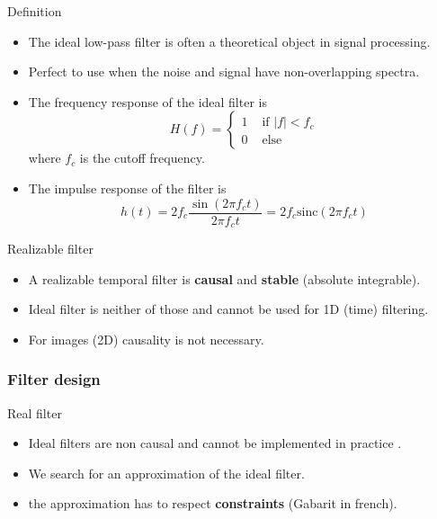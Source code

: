   \begin{block}{Definition}
    \begin{itemize}
    \item The ideal low-pass filter is often a theoretical object in signal processing.
    \item Perfect to use when the noise and signal have non-overlapping spectra.
    \item The frequency response of the ideal filter is 
$$
H(f)= \left \{ 
\begin{array}{ll}
1 & \text{ if } |f| < f_c \\
0 & \text{ else} 
\end{array}
\right.
$$
where $f_c$ is the cutoff frequency.
\item The impulse response of the filter is %
\begin{equation*}
  h(t)={2f_c\frac{\sin(2\pi f_c t)}{2\pi f_ct}=2f_c\text{sinc}(2\pi f_ct)}
\end{equation*}
    \end{itemize}
  \end{block}
\vspace{-5mm}
  \begin{block}{Realizable filter}
    \begin{itemize}
    \item A realizable temporal filter is \textbf{causal} and \textbf{stable} (absolute integrable).
    \item Ideal filter is neither of those and cannot be used for 1D (time) filtering.
    \item For images (2D) causality is not necessary.
    \end{itemize}
  \end{block}

\subsubsection{Filter design}
  
  \begin{block}{Real filter}
    \begin{itemize}
    \item Ideal filters are non causal and cannot be implemented in practice .
    \item We search for an approximation of the ideal filter.
    \item the approximation has to respect \textbf{constraints} (Gabarit in french).
    \end{itemize}
  \end{block}


